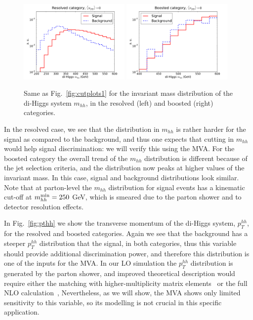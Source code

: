 \begin{figure}[t]
\begin{center}
  \includegraphics[width=0.48\textwidth]{plots/m_HH_C2_res_noPU.pdf}
  \includegraphics[width=0.48\textwidth]{plots/m_HH_C2_bst_noPU.pdf}
  \caption{\small
Same as   Fig.~\ref{fig:cutplots1} for the invariant
mass distribution of the di-Higgs system $m_{hh}$, in
the resolved (left) and boosted (right) categories.
}
\label{fig:mhh}
\end{center}
\end{figure}

In the resolved case, we see that the distribution
in $m_{hh}$ is rather harder for the signal as compared
to the background,
and thus one expects that cutting in $m_{hh}$ would help signal
discrimination: we will verify this using the MVA.
%
For the boosted category the overall trend of the $m_{hh}$ distribution
is different because of the jet selection criteria, and the
distribution now peaks at higher values of the invariant mass.
%
In this case, signal and background distributions
look similar.
%
Note that at parton-level the $m_{hh}$ distribution
for signal events has a kinematic
cut-off at $m_{hh}^{\rm min}=250$ GeV, which is smeared due
to 
the parton shower and to detector resolution effects.
%


In Fig.~\ref{fig:pthh} we show the transverse momentum of
the di-Higgs system, $p_T^{hh}$,
for the resolved and boosted categories.
%
Again we see that the background has a steeper $p_T^{hh}$ distribution
that the signal, in both categories, thus this variable
should provide additional discrimination power, and therefore
this distribution is one of the inputs for the MVA.
%
In our LO simulation the $p_T^{hh}$ distribution is generated
by the parton shower, and improved theoretical
description would require
either the matching with higher-multiplicity
matrix elements~\cite{Maierhofer:2013sha} or
the full NLO calculation~\cite{Frederix:2014hta},
%
Nevertheless, as we will show,
the MVA shows only limited sensitivity to this variable, so its
modelling is not crucial in this specific application.

